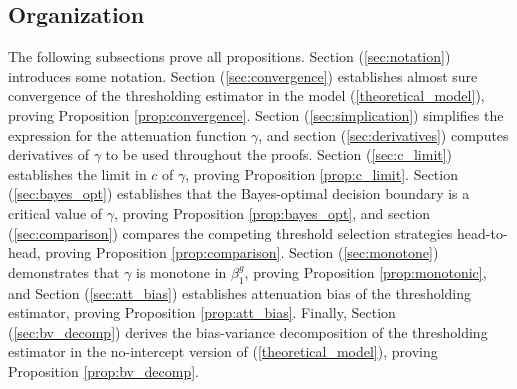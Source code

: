 \documentclass[12pt]{article}
\begin{document}
\begin{appendices}
\begin{refsection}
		\subsection{Organization} The following subsections prove all propositions. Section (\ref{sec:notation}) introduces some notation. Section (\ref{sec:convergence}) establishes almost sure convergence of the thresholding estimator in the model (\ref{theoretical_model}), proving Proposition \ref{prop:convergence}. Section (\ref{sec:simplication}) simplifies the expression for the attenuation function $\gamma$, and section (\ref{sec:derivatives})  computes derivatives of $\gamma$ to be used throughout the proofs. Section (\ref{sec:c_limit}) establishes the limit in $c$ of $\gamma$, proving Proposition \ref{prop:c_limit}. Section (\ref{sec:bayes_opt}) establishes that the Bayes-optimal decision boundary is a critical value of $\gamma$, proving Proposition \ref{prop:bayes_opt}, and section (\ref{sec:comparison}) compares the competing threshold selection strategies head-to-head, proving Proposition \ref{prop:comparison}. Section (\ref{sec:monotone}) demonstrates that $\gamma$ is monotone in $\beta^g_1$, proving Proposition \ref{prop:monotonic}, and Section (\ref{sec:att_bias}) establishes attenuation bias of the thresholding estimator, proving Proposition \ref{prop:att_bias}. Finally, Section (\ref{sec:bv_decomp}) derives the bias-variance decomposition of the thresholding estimator in the no-intercept version of (\ref{theoretical_model}), proving Proposition \ref{prop:bv_decomp}.
		
		

\end{refsection}
\end{appendices}
\end{document}

